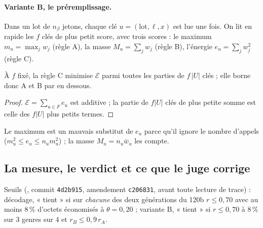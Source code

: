 \paragraph{Variante B, le préremplissage.} Dans un lot de $n_\beta$ jetons, chaque clé $u = (\text{lot}, \ell, x)$ est lue une fois. On lit en rapide les $f$ clés de plus petit score, avec trois scores : le maximum $m_u = \max_j w_j$ (règle A), la masse $M_u = \sum_j w_j$ (règle B), l'énergie $e_u = \sum_j w_j^2$ (règle C).

\begin{proposition}\label{t3mim:prop:p6-oracle}
À $f$ fixé, la règle C minimise $\mathcal E$ parmi toutes les parties de $f\,|U|$ clés ; elle borne donc A et B par en dessous.
\end{proposition}
\begin{proof}
$\mathcal E = \sum_{u \in F} e_u$ est additive ; la partie de $f|U|$ clés de plus petite somme est celle des $f|U|$ plus petits termes.
\end{proof}
Le maximum est un mauvais substitut de $e_u$ parce qu'il ignore le nombre d'appels ($m_u^2 \le e_u \le n_u m_u^2$) ; la masse $M_u = n_u \bar w_u$ les compte.

\subsection{La mesure, le verdict et ce que le juge corrige}\label{t3mim:sec:p6-verdict}

Seuils (, commit \texttt{4d2b915}, amendement \texttt{c206831}, avant toute lecture de trace) : décodage, « tient » si sur \emph{chacune} des deux générations du 120b $r \le 0{,}70$ avec au moins 8\,\% d'octets économisés à $\theta = 0{,}20$ ; variante B, « tient » si $r \le 0{,}70$ à 8\,\% sur 3 genres sur 4 et $r_B \le 0{,}9\,r_A$.

